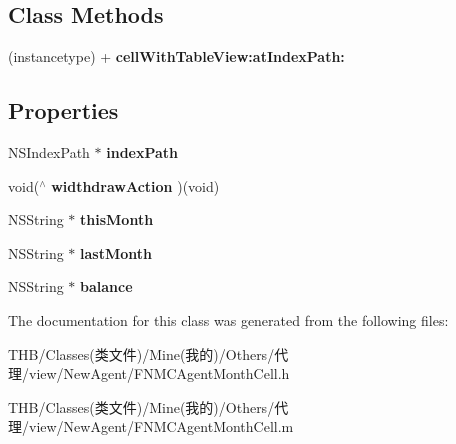 \subsection*{Class Methods}
\begin{DoxyCompactItemize}
\item 
\mbox{\label{interface_f_n_m_c_agent_month_cell_a7d14567f17648e11dff2f3c0bc70f30d}} 
(instancetype) + {\bfseries cell\+With\+Table\+View\+:at\+Index\+Path\+:}
\end{DoxyCompactItemize}
\subsection*{Properties}
\begin{DoxyCompactItemize}
\item 
\mbox{\label{interface_f_n_m_c_agent_month_cell_a30a2a10a9b9627cd87d296369475051e}} 
N\+S\+Index\+Path $\ast$ {\bfseries index\+Path}
\item 
\mbox{\label{interface_f_n_m_c_agent_month_cell_a0881832e2ae24b9adf3f9fb1edebeda3}} 
void($^\wedge$ {\bfseries widthdraw\+Action} )(void)
\item 
\mbox{\label{interface_f_n_m_c_agent_month_cell_a71942d0a74d76b73d830870e121823b5}} 
N\+S\+String $\ast$ {\bfseries this\+Month}
\item 
\mbox{\label{interface_f_n_m_c_agent_month_cell_a5fd636f5f41de2f5da1c8f2cc79c3987}} 
N\+S\+String $\ast$ {\bfseries last\+Month}
\item 
\mbox{\label{interface_f_n_m_c_agent_month_cell_a7dc202193a0a7768de0c5a66c9f333d4}} 
N\+S\+String $\ast$ {\bfseries balance}
\end{DoxyCompactItemize}


The documentation for this class was generated from the following files\+:\begin{DoxyCompactItemize}
\item 
T\+H\+B/\+Classes(类文件)/\+Mine(我的)/\+Others/代理/view/\+New\+Agent/F\+N\+M\+C\+Agent\+Month\+Cell.\+h\item 
T\+H\+B/\+Classes(类文件)/\+Mine(我的)/\+Others/代理/view/\+New\+Agent/F\+N\+M\+C\+Agent\+Month\+Cell.\+m\end{DoxyCompactItemize}
